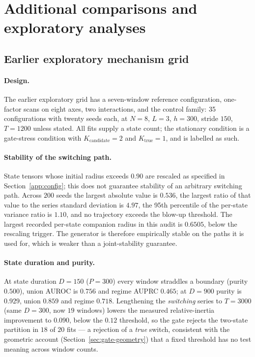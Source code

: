 \documentclass[11pt]{article}
\begin{document}
\FloatBarrier
\section{Additional comparisons and exploratory analyses}
\label{supp:additional}

\subsection{Earlier exploratory mechanism grid}
\label{sec:controlled}

\paragraph{Design.}
The earlier exploratory grid has a seven-window reference configuration,
one-factor scans on eight axes, two
interactions, and the control family: 35 configurations with twenty seeds each,
at $N=8$, $L=3$, $h=300$, stride $150$, $T=1200$ unless stated. All fits supply
a state count; the stationary condition is a gate-stress condition with
$K_{\mathrm{candidate}}=2$ and $K_{\mathrm{true}}=1$, and is labelled as such.

\paragraph{Stability of the switching path.}
State tensors whose initial radius exceeds $0.90$ are rescaled as
specified in Section~\ref{app:config}; this does not guarantee stability
of an arbitrary switching path. Across $200$ seeds the
largest absolute value is $0.536$, the largest ratio of that value to the series
standard deviation is $4.97$, the 95th percentile of the per-state variance
ratio is $1.10$, and no trajectory exceeds the blow-up threshold. The largest
recorded per-state companion radius in this audit is $0.6505$, below the
rescaling trigger. The generator is therefore empirically stable on the paths
it is used for, which is weaker
than a joint-stability guarantee.

\paragraph{State duration and purity.}
At state duration $D=150$ ($P{=}300$) every window straddles a boundary
(purity $0.500$), union AUROC is $0.756$ and regime AUPRC $0.465$; at $D=900$
purity is $0.929$, union $0.859$ and regime $0.718$. Lengthening the
\emph{switching} series to $T=3000$ (same $D{=}300$, now $19$ windows) lowers the
measured relative-inertia improvement to $0.090$, below the $0.12$ threshold, so
the gate rejects the two-state partition in $18$ of $20$ fits --- a rejection of
a \emph{true} switch, consistent with the geometric account
(Section~\ref{sec:gate-geometry}) that a fixed threshold has no test meaning
across window counts.
\end{document}
